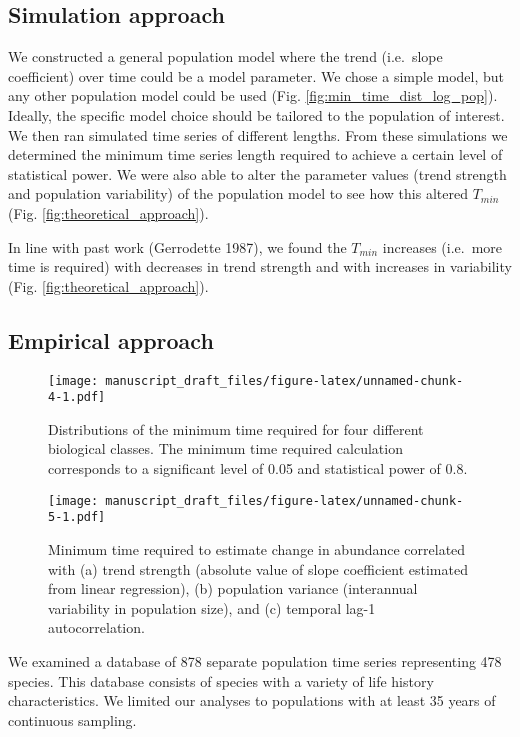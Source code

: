 \documentclass[12pt,]{article}
\begin{document}
\subsection{Simulation approach}\label{simulation-approach-1}

We constructed a general population model where the trend (i.e.~slope
coefficient) over time could be a model parameter. We chose a simple
model, but any other population model could be used (Fig.
\ref{fig:min_time_dist_log_pop}). Ideally, the specific model choice
should be tailored to the population of interest. We then ran simulated
time series of different lengths. From these simulations we determined
the minimum time series length required to achieve a certain level of
statistical power. We were also able to alter the parameter values
(trend strength and population variability) of the population model to
see how this altered \(T_{min}\) (Fig. \ref{fig:theoretical_approach}).

In line with past work (Gerrodette 1987), we found the \(T_{min}\)
increases (i.e.~more time is required) with decreases in trend strength
and with increases in variability (Fig. \ref{fig:theoretical_approach}).

\subsection{Empirical approach}\label{empirical-approach-1}

\begin{figure}[htbp]
\centering
\texttt{[image: manuscript\_draft\_files/figure-latex/unnamed-chunk-4-1.pdf]}
\caption{Distributions of the minimum time required for four different
biological classes. The minimum time required calculation corresponds to
a significant level of 0.05 and statistical power of
0.8.\label{fig:min_time_dist}}
\end{figure}

\begin{figure}[htbp]
\centering
\texttt{[image: manuscript\_draft\_files/figure-latex/unnamed-chunk-5-1.pdf]}
\caption{Minimum time required to estimate change in abundance
correlated with (a) trend strength (absolute value of slope coefficient
estimated from linear regression), (b) population variance (interannual
variability in population size), and (c) temporal lag-1
autocorrelation.\label{fig:correlates}}
\end{figure}

We examined a database of 878 separate population time series
representing 478 species. This database consists of species with a
variety of life history characteristics. We limited our analyses to
populations with at least 35 years of continuous sampling.
\end{document}
